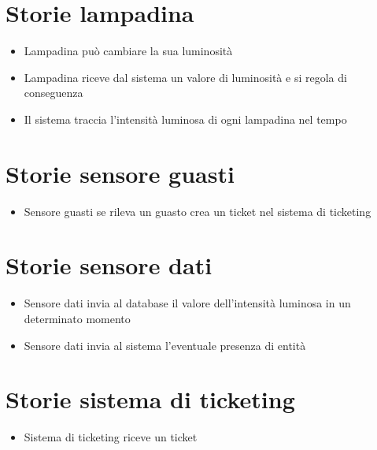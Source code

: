 \section{Storie lampadina}
\begin{itemize}
\item Lampadina può cambiare la sua luminosità
\item Lampadina riceve dal sistema un valore di luminosità e si regola di conseguenza
\item Il sistema traccia l'intensità luminosa di ogni lampadina nel tempo
\end{itemize}


\section{Storie sensore guasti}
\begin{itemize}
\item Sensore guasti se rileva un guasto crea un ticket nel sistema di ticketing
\end{itemize}


\section{Storie sensore dati}
\begin{itemize}
\item Sensore dati invia al database il valore dell'intensità luminosa in un determinato momento
\item Sensore dati invia al sistema l'eventuale presenza di entità
\end{itemize}

\section{Storie sistema di ticketing}
\begin{itemize}
\item Sistema di ticketing riceve un ticket
\end{itemize}
